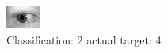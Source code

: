 \begin{figure}[h!]
\begin{center}
\includegraphics[width=0.60\columnwidth]{figures/ID790_class_2_target_4.png}
\end{center}
\caption{ Classification: 2 actual target: 4}
\label{fig:ID790_class_2_target_4}
\end{figure}

